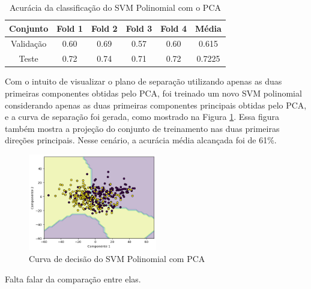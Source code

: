 \documentclass[]{abntex2}
\begin{document}
\begin{table}[H]
    \centering
    \begin{tabular}{|c|c|c|c|c|c|}
    \hline
    \rowcolor[HTML]{C0C0C0} 
    Conjunto                          & Fold 1 & Fold 2 & Fold 3 & Fold 4 & Média  \\ \hline
    \cellcolor[HTML]{C0C0C0}Validação & 0.60   & 0.69   & 0.57   & 0.60   & 0.615  \\ \hline
    \cellcolor[HTML]{C0C0C0}Teste     & 0.72   & 0.74   & 0.71   & 0.72   & 0.7225 \\ \hline
    \end{tabular}
    \caption{Acurácia da classificação do SVM Polinomial com o PCA}
    \label{tab:pca_svm}
\end{table}

Com o intuito de visualizar o plano de separação utilizando apenas as duas primeiras componentes obtidas pelo PCA, foi treinado um novo SVM polinomial considerando apenas as duas primeiras componentes principais obtidas pelo PCA, e a curva de separação foi gerada, como mostrado na Figura \ref{fig:pca_reta}. Essa figura também mostra a projeção do conjunto de treinamento nas duas primeiras direções principais. Nesse cenário, a acurácia média alcançada foi de 61\%.

\begin{figure}[H]
    \centering 
    \includegraphics[width=0.5\textwidth]{imgs/ex1/pca_reta.png}
    \caption{Curva de decisão do SVM Polinomial com PCA}
    \label{fig:pca_reta} %
\end{figure}

{\color{red}Falta falar da comparação entre elas.}
\end{document}
